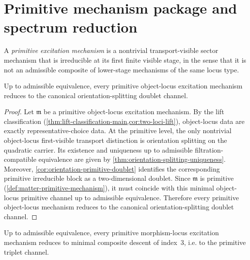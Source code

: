 \section{Primitive mechanism package and spectrum reduction}
\label{sec:spectral-primitive-package}

\begin{definition}
\label{def:matter-primitive-mechanism}
A \emph{primitive excitation mechanism} is a nontrivial transport-visible
sector mechanism that is irreducible at its first finite visible stage,
in the sense that it is not an admissible composite of lower-stage
mechanisms of the same locus type.
\end{definition}

\begin{lemma}
\label{lem:matter-object-reduction}
Up to admissible equivalence, every primitive object-locus excitation
mechanism reduces to the canonical orientation-splitting doublet channel.
\end{lemma}

\begin{proof}
Let $\mathfrak m$ be a primitive object-locus excitation mechanism.
By the lift classification
(\cref{thm:lift-classification-main,cor:two-loci-lift}), object-locus
data are exactly representative-choice data.
At the primitive level, the only nontrivial object-locus first-visible
transport distinction is orientation splitting on the quadratic carrier.
Its existence and uniqueness up to admissible filtration-compatible
equivalence are given by
\cref{thm:orientation-splitting-uniqueness}.
Moreover, \cref{cor:orientation-primitive-doublet} identifies the
corresponding primitive irreducible block as a two-dimensional doublet.
Since $\mathfrak m$ is primitive
(\cref{def:matter-primitive-mechanism}), it must coincide with this
minimal object-locus primitive channel up to admissible equivalence.
Therefore every primitive object-locus mechanism reduces to the canonical
orientation-splitting doublet channel.
\end{proof}

\begin{lemma}
\label{lem:matter-morphism-reduction}
Up to admissible equivalence, every primitive morphism-locus excitation
mechanism reduces to minimal composite descent of index~$3$, i.e.
to the primitive triplet channel.
\end{lemma}

